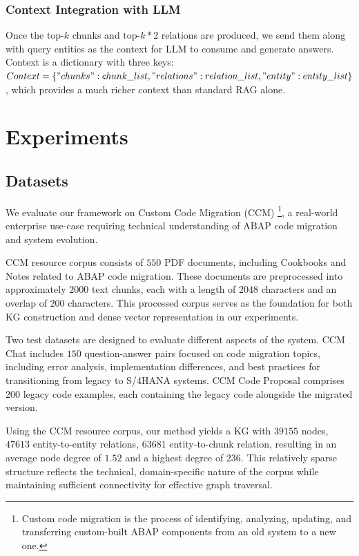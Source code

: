 \documentclass[runningheads]{llncs}
\begin{document}
\subsubsection{Context Integration with LLM}
Once the $\text{top-}k$ chunks and $\text{top-}k *2$ relations are produced, we send them along with query entities as the context for LLM to consume and generate answers. Context is a dictionary with three keys: $Context = \{"chunks":chunk\_list, "relations": relation\_list, "entity": entity\_list\}$, which provides a much richer context than standard RAG alone.

\section{Experiments}
\label{sec:experiments}

\subsection{Datasets}
We evaluate our framework on Custom Code Migration (CCM) \footnote{Custom code migration is the process of identifying, analyzing, updating, and transferring custom-built ABAP components from an old system to a new one.}, a real-world enterprise use-case requiring technical understanding of ABAP code migration and system evolution. 

CCM resource corpus consists of $550$ PDF documents, including Cookbooks and Notes related to ABAP code migration. These documents are preprocessed into approximately $2000$ text chunks, each with a length of $2048$ characters and an overlap of $200$ characters. This processed corpus serves as the foundation for both KG construction and dense vector representation in our experiments.  

Two test datasets are designed to evaluate different aspects of the system. CCM Chat includes $150$ question-answer pairs focused on code migration topics, including error analysis, implementation differences, and best practices for transitioning from legacy to S/4HANA systems. CCM Code Proposal comprises $200$ legacy code examples, each containing the legacy code alongside the migrated version.

Using the CCM resource corpus, our method yields a KG with $39155$ nodes, $47613$ entity-to-entity relations, $63681$ entity-to-chunk relation, resulting in an average node degree of $1.52$ and a highest degree of $236$. This relatively sparse structure reflects the technical, domain-specific nature of the corpus while maintaining sufficient connectivity for effective graph traversal.
\end{document}
